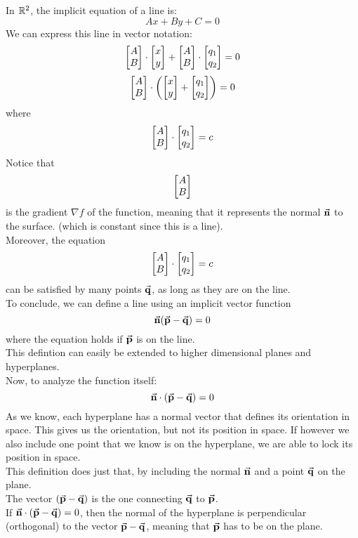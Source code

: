 \documentclass[12pt]{article}
\begin{document}
    In $\mathbb{R}^2$, the implicit equation of a line is:
    \[
        Ax + By + C = 0
    \]
    We can express this line in vector
    notation:
    \[ \begin{bmatrix} {A} \\ {B} \end{bmatrix} \cdot \begin{bmatrix} {x} \\{y} \end{bmatrix} 
    + \begin{bmatrix} {A}\\{B} \end{bmatrix}  \cdot \begin{bmatrix} {q_1}\\{q_2} \end{bmatrix} = 0 \]
    \[ \begin{bmatrix} {A}\\{B} \end{bmatrix}  \cdot \left( \begin{bmatrix} {x}\\{y} \end{bmatrix}
    + \begin{bmatrix} {q_1}\\{q_2} \end{bmatrix} \right) = 0 \]
    where
    \[ \begin{bmatrix} {A}\\{B} \end{bmatrix} \cdot \begin{bmatrix} {q_1}\\{q_2} \end{bmatrix} = c \]
    Notice that
    \[ \begin{bmatrix} {A}\\{B} \end{bmatrix} \]
    is the gradient $\nabla f$ of the function,
    meaning that it represents the normal $\vec{\mathbf{n}}$
    to the surface.
    (which is constant since this is a line). \\
    Moreover, the equation 
    \[ \begin{bmatrix} {A}\\{B} \end{bmatrix} \cdot \begin{bmatrix} {q_1}\\{q_2} \end{bmatrix} = c \]
    can be satisfied by many points $\vec{\mathbf{q}}$,
    as long as they are on the line. \\
    To conclude, we can define a line
    using an implicit vector function
    \[ \vec{\mathbf{n}}(\vec{\mathbf{p}} - \vec{\mathbf{q}}) = 0 \]
    where the equation holds if $\vec{\mathbf{p}}$
    is on the line. \\
    
    This defintion can easily be extended
    to higher dimensional planes and hyperplanes. \\

    Now, to analyze the function itself:
    \[
        \vec{\mathbf{n}} \cdot (\vec{\mathbf{p}} - \vec{\mathbf{q}}) = 0
    \]
    As we know, each hyperplane has a normal vector that
    defines its orientation in space.
    This gives us the orientation, but not its position
    in space.
    If however we also include one point that we know
    is on the hyperplane, we are able to lock its position 
    in space. \\
    This definition does just that,
    by including the normal $\vec{\mathbf{n}}$
    and a point $\vec{\mathbf{q}}$ on the plane. \\
    The vector $(\vec{\mathbf{p}} - \vec{\mathbf{q}})$
    is the one connecting $\vec{\mathbf{q}}$ to $\vec{\mathbf{p}}$. \\
    If $\vec{\mathbf{n}} \cdot (\vec{\mathbf{p}} - \vec{\mathbf{q}}) = 0$,
    then the normal of the hyperplane
    is perpendicular (orthogonal) to the vector
    $\vec{\mathbf{p}} - \vec{\mathbf{q}}$,
    meaning that $\vec{\mathbf{p}}$ has to be on the plane. \\
\end{document}
